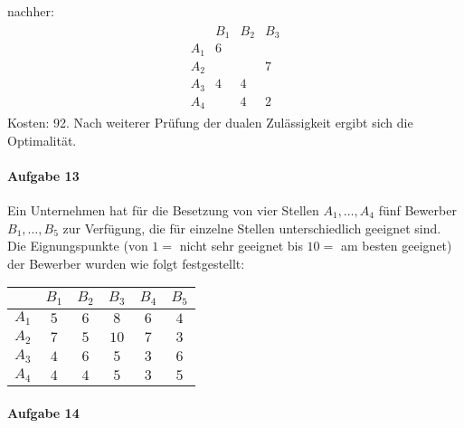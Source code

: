 \documentclass[
a4paper, %
11pt,
]
{scrartcl}
\begin{document}
\begin{enumerate}[(a)]
\begin{minipage}[t]{0.4\textwidth}
\begin{center}
      \end{center}
    \end{minipage}
    \begin{minipage}[t]{0.2\textwidth}
      nachher:
      \begin{align*}
        \begin{matrix}
              & B_1 & B_2 & B_3\\
          A_1 & 6   &     & \\
          A_2 &     &     & 7\\
          A_3 & 4   & 4   & \\
          A_4 &     & 4   & 2
        \end{matrix}
      \end{align*}
      Kosten: 92. Nach weiterer Prüfung der dualen Zulässigkeit ergibt sich die
      Optimalität.
    \end{minipage}
\end{enumerate}

\paragraph{Aufgabe 13}%
\label{par:aufgabe_13}

Ein Unternehmen hat für die Besetzung von vier Stellen $A_1, \ldots, A_4$ fünf
Bewerber $B_1, \ldots, B_5$ zur Verfügung, die für einzelne Stellen
unterschiedlich geeignet sind. Die Eignungspunkte (von $1 = $ nicht sehr
geeignet bis $10 =$ am besten geeignet) der Bewerber wurden wie folgt
festgestellt:
\begin{center}
  \begin{tabular}{c|ccccc}
           & $B_1$ & $B_2$ & $B_3$ & $B_4$ & $B_5$\\\hline
    $A_1$  & $5$   & $6$   & $8$   & $6$   & $4$\\
    $A_2$  & $7$   & $5$   & $10$  & $7$   & $3$\\
    $A_3$  & $4$   & $6$   & $5$   & $3$   & $6$\\
    $A_4$  & $4$   & $4$   & $5$   & $3$   & $5$\\
  \end{tabular}
\end{center}

\paragraph{Aufgabe 14}%
\label{par:aufgabe_14}
\end{document}

